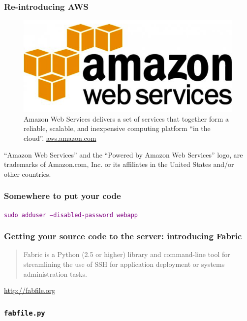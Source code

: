 \documentclass{beamer}
\newcommand\aws[1]{\textcolor{purple}{\texttt{#1}}}
\begin{document}
\begin{frame}
  \frametitle{Re-introducing AWS}
  \begin{figure}[h!]
    \centering
    \includegraphics[scale=0.4]{imgs/aws_logo.png}
    \caption{Amazon Web Services delivers a set of services that together form a reliable, scalable, and inexpensive computing platform ``in the cloud''. \url{aws.amazon.com}}
    \label{fig:aws_logo}
  \end{figure}

  {\tiny ``Amazon Web Services'' and the ``Powered by Amazon Web
    Services'' logo, are trademarks of Amazon.com, Inc. or its
    affiliates in the United States and/or other countries.}
\end{frame}

\begin{frame}[fragile]
  \frametitle{Somewhere to put your code}

  \aws{sudo adduser --disabled-password webapp}

\end{frame}

\begin{frame}
  \frametitle{Getting your source code to the server: introducing
    Fabric}

  \begin{quote}
  Fabric is a Python (2.5 or higher) library and command-line tool for
  streamlining the use of SSH for application deployment or systems
  administration tasks.
  \end{quote}

  \url{http://fabfile.org}

\end{frame}

\begin{frame}
  \frametitle{\texttt{fabfile.py}}
  \inputminted{python}{../steps/04-deployment/01-demo-app/fabfile.py}
\end{frame}
\end{document}
